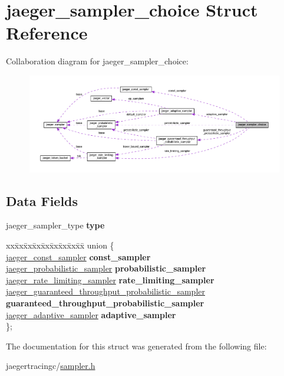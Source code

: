 \hypertarget{structjaeger__sampler__choice}{}\section{jaeger\+\_\+sampler\+\_\+choice Struct Reference}
\label{structjaeger__sampler__choice}


Collaboration diagram for jaeger\+\_\+sampler\+\_\+choice\+:\nopagebreak
\begin{figure}[H]
\begin{center}
\leavevmode
\includegraphics[width=350pt]{structjaeger__sampler__choice__coll__graph}
\end{center}
\end{figure}
\subsection*{Data Fields}
\begin{DoxyCompactItemize}
\item 
\mbox{\label{structjaeger__sampler__choice_a408e49e3e0f0ca190a8ae9a8950eaa06}} 
jaeger\+\_\+sampler\+\_\+type {\bfseries type}
\item 
\mbox{\label{structjaeger__sampler__choice_a6ca4bd899bbdbbdc8a16998c8ff2d15c}} 
\begin{tabbing}
xx\=xx\=xx\=xx\=xx\=xx\=xx\=xx\=xx\=\kill
union \{\\
\>\mbox{\hyperlink{structjaeger__const__sampler}{jaeger\_const\_sampler}} {\bfseries const\_sampler}\\
\>\mbox{\hyperlink{structjaeger__probabilistic__sampler}{jaeger\_probabilistic\_sampler}} {\bfseries probabilistic\_sampler}\\
\>\mbox{\hyperlink{structjaeger__rate__limiting__sampler}{jaeger\_rate\_limiting\_sampler}} {\bfseries rate\_limiting\_sampler}\\
\>\mbox{\hyperlink{structjaeger__guaranteed__throughput__probabilistic__sampler}{jaeger\_guaranteed\_throughput\_probabilistic\_sampler}} {\bfseries guaranteed\_throughput\_probabilistic\_sampler}\\
\>\mbox{\hyperlink{structjaeger__adaptive__sampler}{jaeger\_adaptive\_sampler}} {\bfseries adaptive\_sampler}\\
\}; \\

\end{tabbing}\end{DoxyCompactItemize}


The documentation for this struct was generated from the following file\+:\begin{DoxyCompactItemize}
\item 
jaegertracingc/\mbox{\hyperlink{sampler_8h}{sampler.\+h}}\end{DoxyCompactItemize}
